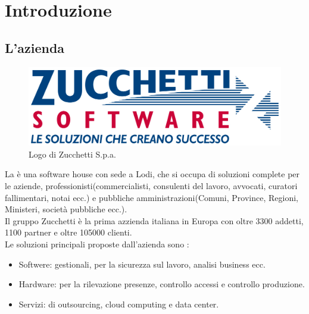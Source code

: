 
\chapter{Introduzione}
\label{cap:introduzione}

\section{L'azienda}

\begin{figure}[htp]
\centering
\includegraphics[width=\textwidth/2]{../immagini/logo_zucchetti}
\caption{Logo di Zucchetti S.p.a.}
\end{figure}

La \myCompany è una software house con sede a Lodi, che si occupa di soluzioni complete per le aziende, professionisti(commercialisti, consulenti del lavoro, avvocati, curatori fallimentari, notai ecc.) e pubbliche amministrazioni(Comuni, Province, Regioni, Ministeri, società pubbliche ecc.).\\
Il gruppo Zucchetti è la prima azzienda italiana in Europa con oltre 3300 addetti, 1100 partner e oltre 105000 clienti.\\
Le soluzioni principali proposte dall'azienda sono :\\
\begin{itemize}
\item Softwere: gestionali, per la sicurezza sul lavoro, analisi business ecc.
\item Hardware: per la rilevazione presenze, controllo accessi e controllo produzione.
\item Servizi: di outsourcing, cloud computing e data center.
\end{itemize}


